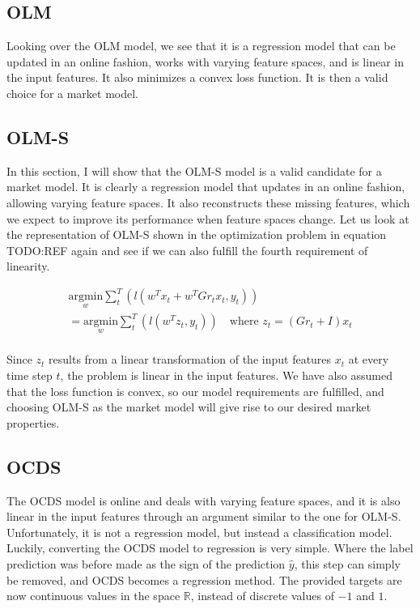 \subsection{OLM}

Looking over the OLM model, we see that it is a regression model that can be
updated in an online fashion, works with varying feature spaces, and is linear
in the input features. It also minimizes a convex loss function. It is then a
valid choice for a market model.

\subsection{OLM-S}

In this section, I will show that the OLM-S model is a valid candidate for a
market model. It is clearly a regression model that updates in an online
fashion, allowing varying feature spaces. It also reconstructs these missing
features, which we expect to improve its performance when feature spaces
change. Let us look at the representation of OLM-S shown in the optimization
problem in equation TODO:REF again and see if we can also fulfill the fourth
requirement of linearity. 

\begin{align}
  \underset{w}{\text {argmin}} \sum_{t}^{T} ( l(w^T x_t + w^T Gr_t x_t, y_t) ) \\
  = \underset{w}{\text {argmin}} \sum_{t}^{T} ( l(w^T z_t, y_t) ) \,\,\,\, \text{ where } z_t = (Gr_t + I) x_t\\
\end{align}

Since $z_t$ results from a linear transformation of the input features $x_t$ at
every time step $t$, the problem is linear in the input features. We have also
assumed that the loss function is convex, so our model requirements are
fulfilled, and choosing OLM-S as the market model will give rise to our desired
market properties.

\subsection{OCDS}

The OCDS model is online and deals with varying feature spaces, and it is also
linear in the input features through an argument similar to the one for OLM-S.
Unfortunately, it is not a regression model, but instead a classification
model. Luckily, converting the OCDS model to regression is very simple. Where
the label prediction was before made as the sign of the prediction $\hat y$,
this step can simply be removed, and OCDS becomes a regression method. The
provided targets are now continuous values in the space $\mathbb R$, instead of
discrete values of $-1$ and $1$.

